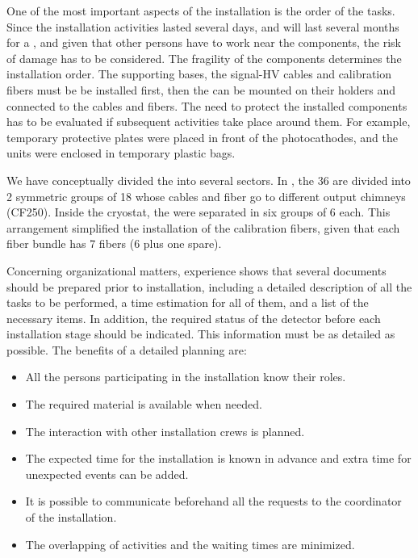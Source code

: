 One of the most important aspects of the installation is the order of the tasks. Since the   installation activities lasted several days, %
and will last several months for a , and given that other persons have to work near the  components, the risk of damage has to be considered. The fragility of the components determines the installation order. The  supporting bases, the signal-HV  cables and calibration fibers must be be installed first, then the  can be mounted on their holders and connected to the cables and fibers. The need to protect the installed components has to be evaluated if subsequent activities take place around them. For example,  temporary protective plates were placed in front of the   photocathodes, and the  units were enclosed in temporary plastic bags. 

We have conceptually divided the   into several sectors. In , the \num{36}  are divided into \num{2} symmetric groups of 18 whose cables and fiber go to different output chimneys (CF250). Inside the cryostat, the  were separated in six groups of \num{6} each. This arrangement simplified the installation of the calibration fibers, given that each fiber bundle has \num{7} fibers (\num{6} plus one spare). 

Concerning organizational matters,  experience shows that several documents should be prepared prior to installation, including a detailed description of all the tasks to be performed, a time estimation for all of them, and a list of the necessary items. In addition, the required status of the detector before each installation stage should be indicated. This information must be as detailed as possible. The benefits of a detailed planning are:

\begin{itemize}
\item All the persons participating in the  installation know their roles.
\item The required material is %
available when needed.
\item The interaction with other installation crews is planned.
\item The expected time for the installation is known in advance and extra time for unexpected events can be added.
\item It is possible to communicate beforehand all the requests to the coordinator of the installation.
\item The overlapping of activities and the waiting times are minimized. 
\end{itemize}

